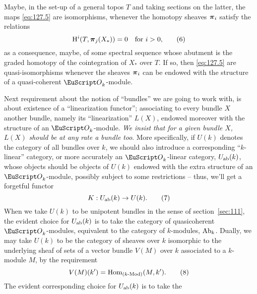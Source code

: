 \begin{remark}
  Maybe, in the set-up of a general topos $T$ and taking sections on
  the latter, the maps \eqref{eq:127.5} are isomorphisms, whenever
  the homotopy sheaves ${\boldsymbol\pi}_i$ satisfy the relations
  \begin{equation}
    \label{eq:127.6}
    \mathrm H^i(T, {\boldsymbol\pi}_j(X_*))=0 \quad
    \text{for $i>0$,}\tag{6}
  \end{equation}
  as a consequence, maybe, of some spectral sequence whose abutment is
  the graded homotopy of the cointegration of $X_*$ over $T$. If so,
  then \eqref{eq:127.5} are quasi-isomorphisms whenever the sheaves
  ${\boldsymbol\pi}_i$ can be endowed with the structure of a quasi-coherent
  $\scrO_k$-module.
\end{remark}

\label{sec:128}%
Next requirement about the notion of ``bundles'' we are going to work
with, is about existence of a ``linearization functor''; associating
to every bundle $X$ another bundle, namely its ``linearization''
$L(X)$, endowed moreover with the structure of an
$\scrO_k$-module. \emph{We insist that for a given bundle $X$, $L(X)$
  should be at any rate a bundle too}. More specifically, if $U(k)$
denotes the category of all bundles over $k$, we should also introduce
a corresponding ``$k$-linear'' category, or more accurately an
$\scrO_k$-linear category, $U_{\mathrm{ab}}(k)$, whose objects should be
objects of $U(k)$ endowed with the extra structure of an
$\scrO_k$-module, possibly subject to some restrictions -- thus, we'll
get a forgetful functor
\begin{equation}
  \label{eq:128.7}
  K: U_{\mathrm{ab}}(k)\to U(k).\tag{7}
\end{equation}
When we take $U(k)$ to be unipotent bundles in the sense of
section~\ref{sec:111}, the evident choice for $U_{\mathrm{ab}}(k)$ is to take
the category of quasicoherent $\scrO_k$-modules, equivalent to the
category of $k$-modules, $\operatorname{Ab}_k$. Dually, we may take $U(k)$ to be
the category of sheaves over $k$ isomorphic to the underlying sheaf of
sets of a vector bundle $V(M)$ over $k$ associated to a $k$-module
$M$, by the requirement
\begin{equation}
  \label{eq:128.8}
  V(M)(k') = \operatorname{Hom}_{(k\textup{-Mod})}(M,k').\tag{8}
\end{equation}
The evident corresponding choice for $U_{\mathrm{ab}}(k)$ is to take the

